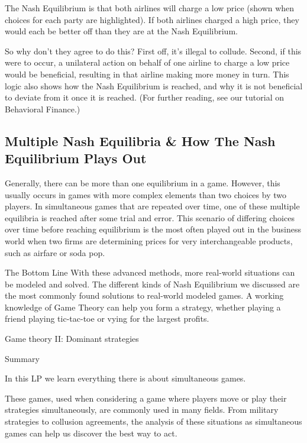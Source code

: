 The Nash Equilibrium is that both airlines will charge a low price (shown when choices for each party are highlighted). If both airlines charged a high price, they would each be better off than they are at the Nash Equilibrium.

So why don't they agree to do this? First off, it's illegal to collude. Second, if this were to occur, a unilateral action on behalf of one airline to charge a low price would be beneficial, resulting in that airline making more money in turn. This logic also shows how the Nash Equilibrium is reached, and why it is not beneficial to deviate from it once it is reached. (For further reading, see our tutorial on Behavioral Finance.)

\subsection{Multiple Nash Equilibria \& How The Nash Equilibrium Plays Out}
Generally, there can be more than one equilibrium in a game. However, this usually occurs in games with more complex elements than two choices by two players. In simultaneous games that are repeated over time, one of these multiple equilibria is reached after some trial and error. This scenario of differing choices over time before reaching equilibrium is the most often played out in the business world when two firms are determining prices for very interchangeable products, such as airfare or soda pop.

The Bottom Line
With these advanced methods, more real-world situations can be modeled and solved. The different kinds of Nash Equilibrium we discussed are the most commonly found solutions to real-world modeled games. A working knowledge of Game Theory can help you form a strategy, whether playing a friend playing tic-tac-toe or vying for the largest profits.



Game theory II: Dominant strategies

Summary

In this LP we learn everything there is about simultaneous games. 

These games, used when considering a game where players move or play their strategies simultaneously, are commonly used in many fields. From military strategies to collusion agreements, the analysis of these situations as simultaneous games can help us discover the best way to act.

